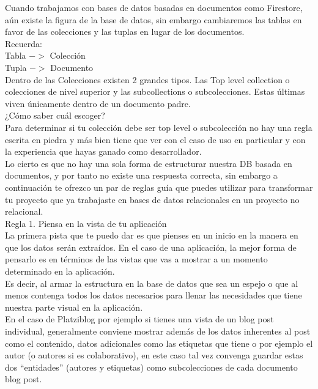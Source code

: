 \documentclass{article}
\begin{document}
Cuando trabajamos con bases de datos basadas en documentos como Firestore, aún
existe la figura de la base de datos, sin embargo cambiaremos las tablas en
favor de las colecciones y las tuplas en lugar de los documentos.\\

Recuerda:\\

Tabla $->$ Colección\\
Tupla $->$ Documento\\

Dentro de las Colecciones existen 2 grandes tipos. Las Top level collection o
colecciones de nivel superior y las subcollections o subcolecciones. Estas
últimas viven únicamente dentro de un documento padre.\\

¿Cómo saber cuál escoger?\\

Para determinar si tu colección debe ser top level o subcolección no hay una
regla escrita en piedra y más bien tiene que ver con el caso de uso en
particular y con la experiencia que hayas ganado como desarrollador.\\

Lo cierto es que no hay una sola forma de estructurar nuestra DB basada en
documentos, y por tanto no existe una respuesta correcta, sin embargo a
continuación te ofrezco un par de reglas guía que puedes utilizar para
transformar tu proyecto que ya trabajaste en bases de datos relacionales en un
proyecto no relacional.\\

Regla 1. Piensa en la vista de tu aplicación\\

La primera pista que te puedo dar es que pienses en un inicio en la manera en
que los datos serán extraídos. En el caso de una aplicación, la mejor forma de
pensarlo es en términos de las vistas que vas a mostrar a un momento
determinado en la aplicación.\\

Es decir, al armar la estructura en la base de datos que sea un espejo o que al
menos contenga todos los datos necesarios para llenar las necesidades que tiene
nuestra parte visual en la aplicación.\\

En el caso de Platziblog por ejemplo si tienes una vista de un blog post
individual, generalmente conviene mostrar además de los datos inherentes al
post como el contenido, datos adicionales como las etiquetas que tiene o por
ejemplo el autor (o autores si es colaborativo), en este caso tal vez convenga
guardar estas dos “entidades” (autores y etiquetas) como subcolecciones de cada
documento blog post.\\
\end{document}
